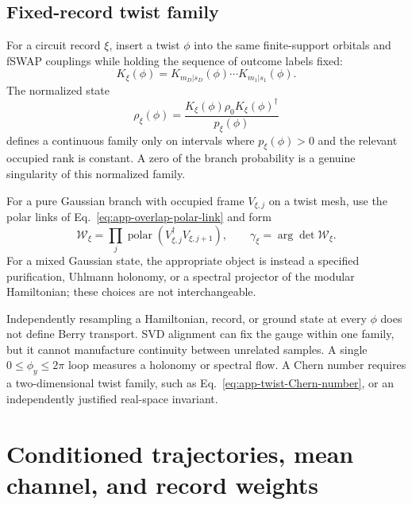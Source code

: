\subsection{Fixed-record twist family}

For a circuit record \(\xi\), insert a twist \(\phi\) into the same
finite-support orbitals and fSWAP couplings while holding the sequence of
outcome labels fixed:
\begin{equation}
    K_\xi(\phi)
    =K_{m_D|s_D}(\phi)\cdots K_{m_1|s_1}(\phi).
    \label{eq:app-fixed-record-word}
\end{equation}
The normalized state
\begin{equation}
    \rho_\xi(\phi)
    =\frac{K_\xi(\phi)\rho_0K_\xi(\phi)^\dagger}
    {p_\xi(\phi)}
    \label{eq:app-fixed-record-state}
\end{equation}
defines a continuous family only on intervals where \(p_\xi(\phi)>0\) and
the relevant occupied rank is constant.  A zero of the branch probability
is a genuine singularity of this normalized family.

For a pure Gaussian branch with occupied frame \(V_{\xi,j}\) on a twist
mesh, use the polar links of Eq.~\eqref{eq:app-overlap-polar-link} and form
\begin{equation}
    \mathcal W_\xi
    =\prod_j\operatorname{polar}
      \!\left(V_{\xi,j}^\dagger V_{\xi,j+1}\right),
    \qquad
    \gamma_\xi=\arg\det\mathcal W_\xi.
    \label{eq:app-fixed-record-holonomy}
\end{equation}
For a mixed Gaussian state, the appropriate object is instead a specified
purification, Uhlmann holonomy, or a spectral projector of the modular
Hamiltonian; these choices are not interchangeable.

Independently resampling a Hamiltonian, record, or ground state at every
\(\phi\) does not define Berry transport.  SVD alignment can fix the gauge
within one family, but it cannot manufacture continuity between unrelated
samples.  A single \(0\le\phi_y\le2\pi\) loop measures a holonomy or spectral
flow.  A Chern number requires a two-dimensional twist family, such as
Eq.~\eqref{eq:app-twist-Chern-number}, or an independently justified
real-space invariant.


\section{Conditioned trajectories, mean channel, and record weights}
\label{app:ensemble-distinctions}

